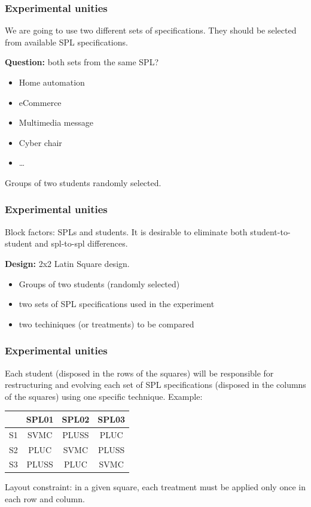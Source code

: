 \documentclass{beamer}
\begin{document}
\begin{frame}
\frametitle{Experimental unities}

We are going to use two different sets of specifications. They should be
selected from available SPL specifications. 

{\bf Question:} both sets from the same SPL?

\begin{itemize}
  \item Home automation
  \item eCommerce
  \item Multimedia message
  \item Cyber chair
  \item \ldots
\end{itemize}

Groups of two students randomly selected.

\end{frame}


\begin{frame}
\frametitle{Experimental unities}

\alert{Block factors:} SPLs and students. It is desirable to eliminate both
student-to-student and spl-to-spl differences.

{\bf Design:} \alert{2x2} Latin Square design. 

\begin{itemize}
  \item Groups of \alert{two students} (randomly selected)
  \item \alert{two sets of SPL specifications} used in the experiment
  \item two techiniques (or treatments) to be compared
\end{itemize}

\end{frame}

\begin{frame}
\frametitle{Experimental unities}

Each student (disposed in the rows of the squares) will be responsible for
restructuring and evolving each set of SPL specifications (disposed in the
columns of the squares) using one specific technique. Example:

\begin{center}
\small{
\begin{tabular}{l||c|c|c}
 		& 	SPL01 	& 	SPL02 	&  SPL03 		\\ \hline \hline
 S1   	&	SVMC    &  	PLUSS   &  PLUC		\\ \hline
 S2   	&	PLUC    &   SVMC   	&  PLUSS	\\ \hline	
 S3   	&	PLUSS   &   PLUC  	&  SVMC		\\ \hline
\end{tabular}
}
\end{center}

\alert{Layout constraint:} in a given square, each treatment must be applied
only once in each row and column.

\end{frame} 
\end{document}
